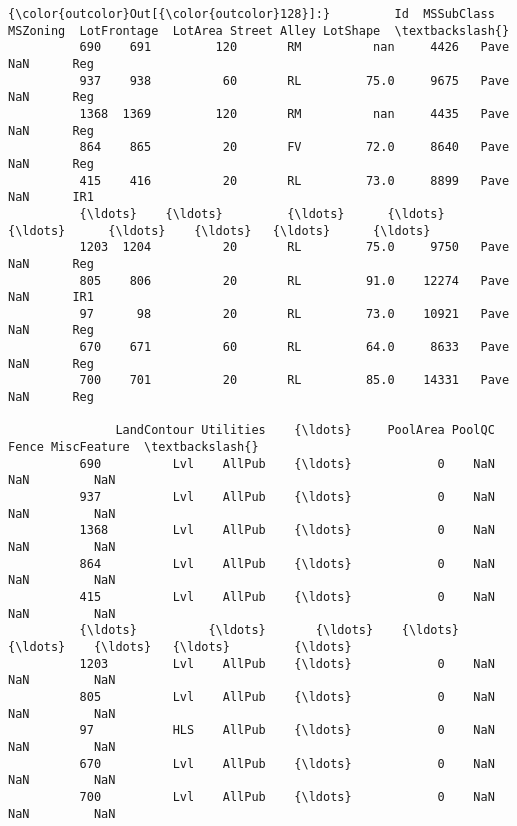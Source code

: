 \documentclass[11pt]{article}
\begin{document}
\begin{Verbatim}[commandchars=\\\{\}]
{\color{outcolor}Out[{\color{outcolor}128}]:}         Id  MSSubClass MSZoning  LotFrontage  LotArea Street Alley LotShape  \textbackslash{}
          690    691         120       RM          nan     4426   Pave   NaN      Reg   
          937    938          60       RL         75.0     9675   Pave   NaN      Reg   
          1368  1369         120       RM          nan     4435   Pave   NaN      Reg   
          864    865          20       FV         72.0     8640   Pave   NaN      Reg   
          415    416          20       RL         73.0     8899   Pave   NaN      IR1   
          {\ldots}    {\ldots}         {\ldots}      {\ldots}          {\ldots}      {\ldots}    {\ldots}   {\ldots}      {\ldots}   
          1203  1204          20       RL         75.0     9750   Pave   NaN      Reg   
          805    806          20       RL         91.0    12274   Pave   NaN      IR1   
          97      98          20       RL         73.0    10921   Pave   NaN      Reg   
          670    671          60       RL         64.0     8633   Pave   NaN      Reg   
          700    701          20       RL         85.0    14331   Pave   NaN      Reg   
          
               LandContour Utilities    {\ldots}     PoolArea PoolQC Fence MiscFeature  \textbackslash{}
          690          Lvl    AllPub    {\ldots}            0    NaN   NaN         NaN   
          937          Lvl    AllPub    {\ldots}            0    NaN   NaN         NaN   
          1368         Lvl    AllPub    {\ldots}            0    NaN   NaN         NaN   
          864          Lvl    AllPub    {\ldots}            0    NaN   NaN         NaN   
          415          Lvl    AllPub    {\ldots}            0    NaN   NaN         NaN   
          {\ldots}          {\ldots}       {\ldots}    {\ldots}          {\ldots}    {\ldots}   {\ldots}         {\ldots}   
          1203         Lvl    AllPub    {\ldots}            0    NaN   NaN         NaN   
          805          Lvl    AllPub    {\ldots}            0    NaN   NaN         NaN   
          97           HLS    AllPub    {\ldots}            0    NaN   NaN         NaN   
          670          Lvl    AllPub    {\ldots}            0    NaN   NaN         NaN   
          700          Lvl    AllPub    {\ldots}            0    NaN   NaN         NaN   
          

\end{Verbatim}
\end{document}
